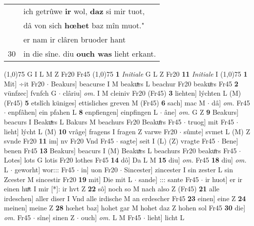 \documentclass[8pt,a4paper,notitlepage]{article}
\begin{document}
\begin{table}[ht]
\begin{minipage}[t]{0.5\linewidth}
\begin{tabular}{rl}
 & ich getrûwe \textbf{ir} wol, \textbf{daz} si mir tuot,\\ 
 & dâ von sich \textbf{hœhet} baz mîn muot."\\ 
 & er nam ir clâren bruoder hant\\ 
30 & in die sîne. diu \textbf{ouch was} lieht erkant.\\ 
\end{tabular}
\scriptsize
\line(1,0){75} \newline
G I L M Z Fr20 Fr45 \newline
\line(1,0){75} \newline
\textbf{1} \textit{Initiale} G L Z Fr20  \textbf{11} \textit{Initiale} I  \newline
\line(1,0){75} \newline
\textbf{1} Mit] ÷it Fr20  $\cdot$ Beakurs] beacurse I M beakuͯrs L beachur Fr20 beakuͦrs Fr45 \textbf{2} vünfzec] fvnfch G  $\cdot$ clâriu] \textit{om.} I M cleiniv Fr20 (Fr45) \textbf{3} liehten] lýchten L (M) (Fr45) \textbf{5} etslîch küniges] ettisliches greven M (Fr45) \textbf{6} sach] mac M  $\cdot$ dâ] \textit{om.} Fr45  $\cdot$ enpfâhen] ein pfahen L \textbf{8} enpfiengen] einpfingen L  $\cdot$ âne] \textit{om.} G Z \textbf{9} Beakurs] beacurs I Beakuͯrs L Bakurs M beachurs Fr20 Beakuͦrs Fr45  $\cdot$ truog] mit Fr45  $\cdot$ lieht] lýcht L (M) \textbf{10} vrâge] fragens I fragen Z varwe Fr20  $\cdot$ sûmte] svmet L (M) Z svnde Fr20 \textbf{11} im] nv Fr20 Vnd Fr45  $\cdot$ sagte] seit I (L) (Z) vragte Fr45  $\cdot$ Bene] benen Fr45 \textbf{13} Beakurs] beacurs I (M) Beakuͯrs L beachurs Fr20 beakuͦrs Fr45  $\cdot$ Lotes] lots G lotis Fr20 lothes Fr45 \textbf{14} dô] Da L M \textbf{15} diu] \textit{om.} Fr45 \textbf{18} diu] \textit{om.} L  $\cdot$ geworht] wor::: Fr45  $\cdot$ in] uon Fr20  $\cdot$ Sincester] zincester I sin zester L sin Zcester M sincestir Fr20 \textbf{19} mit] Die mit L  $\cdot$ sande] ::: sante Fr45  $\cdot$ ir huot] er ir einen huͤt I mir [*]: ir hvt Z \textbf{22} sô] noch so M nach also Z (Fr45) \textbf{21} alle irdeschen] aller diser I Vnd alle irdische M an erdescher Fr45 \textbf{23} einen] eine Z \textbf{24} meinen] meine Z \textbf{28} hœhet baz] hohet gar M hohet daz Z hohen sol Fr45 \textbf{30} die] \textit{om.} Fr45  $\cdot$ sîne] sinen Z  $\cdot$ ouch] \textit{om.} L M Fr45  $\cdot$ lieht] licht L \newline
\end{minipage}
\hspace{0.5cm}
\begin{minipage}[t]{0.5\linewidth}

\end{minipage}
\end{table}
\end{document}
